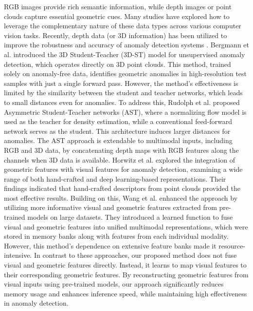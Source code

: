 RGB images provide rich semantic information, while depth images or point clouds capture essential geometric cues. Many studies have explored how to leverage the complementary nature of these data types across various computer vision tasks. Recently, depth data (or 3D information) has been utilized to improve the robustness and accuracy of anomaly detection systems \cite{horwitz2022empirical, wang2023multimodal}. Bergmann et al. \cite{bergmann2023anomaly} introduced the 3D Student-Teacher (3D-ST) model for unsupervised anomaly detection, which operates directly on 3D point clouds. This method, trained solely on anomaly-free data, identifies geometric anomalies in high-resolution test samples with just a single forward pass. However, the method's effectiveness is limited by the similarity between the student and teacher networks, which leads to small distances even for anomalies. To address this, Rudolph et al. \cite{rudolph2023asymmetric} proposed Asymmetric Student-Teacher networks (AST), where a normalizing flow model is used as the teacher for density estimation, while a conventional feed-forward network serves as the student. This architecture induces larger distances for anomalies. The AST approach is extendable to multimodal inputs, including RGB and 3D data, by concatenating depth maps with RGB features along the channels when 3D data is available. Horwitz et al. \cite{horwitz2023back} explored the integration of geometric features with visual features for anomaly detection, examining a wide range of both hand-crafted and deep learning-based representations. Their findings indicated that hand-crafted descriptors from point clouds provided the most effective results. Building on this, Wang et al. \cite{wang2023multimodal} enhanced the approach by utilizing more informative visual and geometric features extracted from pre-trained models on large datasets. They introduced a learned function to fuse visual and geometric features into unified multimodal representations, which were stored in memory banks along with features from each individual modality. However, this method's dependence on extensive feature banks made it resource-intensive. In contrast to these approaches, our proposed method does not fuse visual and geometric features directly. Instead, it learns to map visual features to their corresponding geometric features. By reconstructing geometric features from visual inputs using pre-trained models, our approach significantly reduces memory usage and enhances inference speed, while maintaining high effectiveness in anomaly detection.